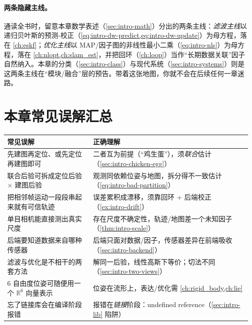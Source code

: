 \paragraph{两条隐藏主线。}
通读全书时，留意本章数学表述（\cref{sec:intro-math}）分出的两条主线：\emph{滤波主线}以递归贝叶斯的预测-校正（\cref{eq:intro-dw-predict,eq:intro-dw-update}）为母方程，落在 \cref{ch:eskf}；\emph{优化主线}以 MAP/因子图的非线性最小二乘（\cref{eq:intro-nls}）为母方程，落在 \cref{ch:nlopt,ch:slam_est}，并把回环（\cref{ch:loop}）当作“长期数据关联”因子自然纳入。本章的分类（\cref{sec:intro-class}）与现代系统（\cref{sec:intro-systems}）则是这两条主线在“模块/融合”层的预告。带着这张地图，你就不会在后续任何一章迷路。

\section*{本章常见误解汇总}
\begin{table}[H]\centering\small
\begin{tabular}{p{} p{}}
\toprule
\textbf{常见误解} & \textbf{正确理解} \\
\midrule
先建图再定位、或先定位再建图即可 & 二者互为前提（“鸡生蛋”），须\emph{联合}估计（\cref{sec:intro-chicken-egg}）\\
联合后验可拆成定位后验 $\times$ 建图后验 & 观测同依赖位姿与地图，拆分得不一致估计（\cref{eq:intro-bad-partition}）\\
把相邻帧运动一段段串起来就有可信轨迹 & 误差累积成漂移，须靠回环 + 后端校正（\cref{ex:intro-drift}）\\
单目相机能直接测出真实尺度 & 存在尺度不确定性，轨迹/地图差一个未知因子（\cref{thm:intro-scale}）\\
后端要知道数据来自哪种传感器 & 后端只面对数据/因子，传感器差异在前端吸收（\cref{sec:intro-backend}）\\
滤波与优化是不相干的两套方法 & 解同一后验，线性高斯下等价；切法不同（\cref{sec:intro-two-views}）\\
6 自由度位姿可随便用一个 $\mathbb{R}^6$ 向量表示 & 位姿在流形上，表达/优化需 \cref{ch:rigid_body,ch:lie}\\
忘了链接库会在编译阶段报错 & 报错在\emph{链接}阶段：undefined reference（\cref{sec:intro-lib} 陷阱）\\
\bottomrule
\end{tabular}
\end{table}

